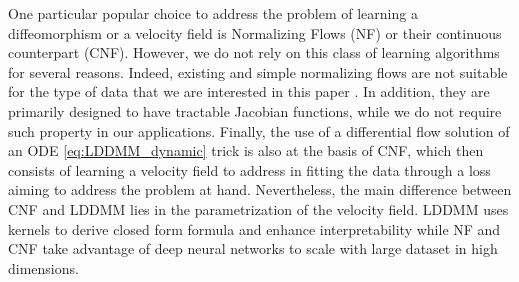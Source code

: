 One particular popular choice to address the problem of learning a diffeomorphism or a velocity field is Normalizing Flows \cite{rezende2015variational,kobyzev2020normalizing} (NF) or their continuous counterpart \cite{chen2018neural,grathwohl2019scalable,salman2018deep} (CNF).
However, we do not rely on this class of learning algorithms for several reasons. Indeed, existing and simple normalizing flows are not suitable for the type of data that we are interested in this paper \cite{feng2023multi,deng2020modeling}. 
  In addition,  they are primarily designed to have tractable Jacobian functions, while we do not require such property in our applications. 
Finally, the use of a differential flow solution of an ODE
\eqref{eq:LDDMM_dynamic} trick is also at the basis of CNF, which
then consists of learning a velocity field to address in fitting the data through a loss aiming to address the problem
at hand. Nevertheless, the main difference between CNF and LDDMM lies in the
parametrization of the velocity field. LDDMM uses kernels to
derive closed form formula and enhance interpretability while
NF and CNF take advantage of deep neural networks to scale with
large dataset in high dimensions.
  









        
